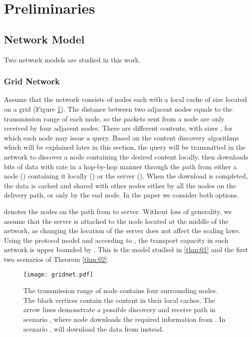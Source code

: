\documentclass[journal]{IEEEtran}
\theoremstyle{plain}
\theoremstyle{remark}
\begin{document}
\section{Preliminaries}
\label{sec:netmodel}

\subsection{Network Model}
Two network models are studied in this work.
\subsubsection{Grid Network}
Assume that the network consists of  nodes  each with a local cache of size  located on a grid (Figure \ref{fig:gridnet}). The distance between two adjacent nodes equals to the transmission range of each node, so the packets sent from a node are only received by four adjacent nodes. There are  different contents,  with sizes , for which each node  may issue a query. Based on the content discovery algorithms which will be explained later in this section, the query will be transmitted in the network to discover a node containing the desired content locally.  then downloads  bits of data with rate  in a hop-by-hop manner through the path  from either a node () containing it locally () or the server (). When the download is completed, the data is cached and shared with other nodes either by all the nodes on the delivery path, or only by the end node. In the paper we consider both options. 

 denotes the nodes on the path from  to server. Without loss of generality, we assume that the server is attached to the node located at the middle of the network, as changing the location of the server does not affect the scaling laws. Using the protocol model and according to \cite{book06:Xue},  the transport capacity in such network is upper bounded by . This is the model studied in \ref{thm:01} and the first two scenarios of Theorem \ref{thm:02}.
\begin{figure}[http]
    \center
      \texttt{[image: gridnet.pdf]}\\
      \caption{The transmission range of node  contains four surrounding nodes. The black vertices contain the content in their  local caches. The arrow lines demonstrate a possible discovery and receive path in scenario , where node  downloads the required information from . In scenario ,  will download the data from  instead.}
    \label{fig:gridnet}
\end{figure}
\end{document}
